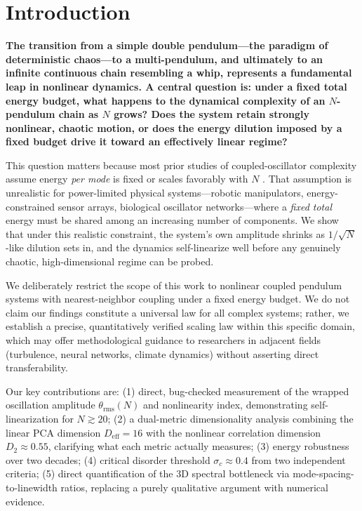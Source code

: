 \documentclass[aps,pre,12pt]{revtex4-2}
\begin{document}
\maketitle

\section{Introduction}

\textbf{The transition from a simple double pendulum---the paradigm of deterministic chaos---to a multi-pendulum, and ultimately to an infinite continuous chain resembling a whip, represents a fundamental leap in nonlinear dynamics. A central question is: under a fixed total energy budget, what happens to the dynamical complexity of an $N$-pendulum chain as $N$ grows? Does the system retain strongly nonlinear, chaotic motion, or does the energy dilution imposed by a fixed budget drive it toward an effectively linear regime?}

This question matters because most prior studies of coupled-oscillator complexity assume energy \emph{per mode} is fixed or scales favorably with $N$ \cite{strogatz2015,pikovsky2003,acebron2005,shinbrot1992}. That assumption is unrealistic for power-limited physical systems---robotic manipulators, energy-constrained sensor arrays, biological oscillator networks---where a \emph{fixed total} energy must be shared among an increasing number of components. We show that under this realistic constraint, the system's own amplitude shrinks as $1/\sqrt{N}$-like dilution sets in, and the dynamics self-linearize well before any genuinely chaotic, high-dimensional regime can be probed.

We deliberately restrict the scope of this work to nonlinear coupled pendulum systems with nearest-neighbor coupling under a fixed energy budget. We do not claim our findings constitute a universal law for all complex systems; rather, we establish a precise, quantitatively verified scaling law within this specific domain, which may offer methodological guidance to researchers in adjacent fields (turbulence, neural networks, climate dynamics) without asserting direct transferability.

Our key contributions are: (1) direct, bug-checked measurement of the wrapped oscillation amplitude $\theta_{\text{rms}}(N)$ and nonlinearity index, demonstrating self-linearization for $N\gtrsim20$; (2) a dual-metric dimensionality analysis combining the linear PCA dimension $D_{\text{eff}}=16$ with the nonlinear correlation dimension $D_2\approx0.55$, clarifying what each metric actually measures; (3) energy robustness over two decades; (4) critical disorder threshold $\sigma_c\approx0.4$ from two independent criteria; (5) direct quantification of the 3D spectral bottleneck via mode-spacing-to-linewidth ratios, replacing a purely qualitative argument with numerical evidence.
\end{document}
